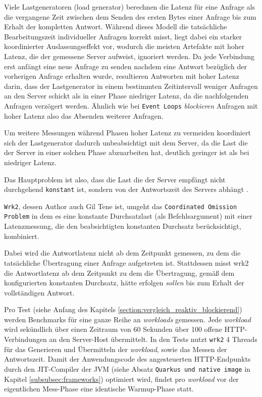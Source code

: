 Viele Lastgeneratoren (load generator) berechnen die Latenz für eine Anfrage als die vergangene Zeit zwischen dem Senden des ersten Bytes einer Anfrage
bis zum Erhalt der kompletten Antwort. Während dieses Modell die tatsächliche Bearbeitungszeit individueller Anfragen korrekt misst,
liegt dabei ein starker koordinierter Auslassungseffekt vor,
wodurch die meisten Artefakte mit hoher Latenz, die der gemessene Server aufweist, ignoriert werden.
Da jede Verbindung erst anfängt eine neue Anfrage zu senden nachdem eine Antwort bezüglich der vorherigen Anfrage erhalten wurde,
resultieren Antworten mit hoher Latenz darin, dass der Lastgenerator in einem bestimmten Zeitintervall weniger Anfragen an den Server schickt als in einer
Phase niedriger Latenz, da die nachfolgenden Anfragen verzögert werden. Ähnlich wie bei \verb|Event Loops| \textit{blockieren}
Anfragen mit hoher Latenz also das Absenden weiterer Anfragen.

Um weitere Messungen während Phasen hoher Latenz zu vermeiden koordiniert sich der Lastgenerator dadurch unbeabsichtigt mit dem Server, da die Last
die der Server in einer solchen Phase abzuarbeiten hat, deutlich geringer ist als bei niedriger Latenz.

Das Hauptproblem ist also, dass die Last die der Server empfängt
nicht durchgehend \verb|konstant| ist, sondern von der Antwortszeit des Servers abhängt \parencite{mci/Friedrich2017}.

\newpage
\verb|Wrk2|, dessen Author auch Gil Tene ist, umgeht das \verb|Coordinated Omission Problem| in dem es eine konstante Durchsatzlast (als Befehlsargument) mit
einer Latenzmessung, die den beabsichtigten konstanten Durchsatz berücksichtigt, kombiniert.

Dabei wird die Antwortlatenz nicht ab dem Zeitpunkt gemessen, zu dem die tatsächliche Übertragung einer Anfrage aufgetreten ist.
Stattdessen misst wrk2 die Antwortlatenz ab dem Zeitpunkt zu dem die Übertragung,
gemäß dem konfigurierten konstanten Durchsatz, hätte erfolgen \textit{sollen} bis zum Erhalt der vollständigen Antwort\parencite{Wrk2}.

Pro Test (siehe Anfang des Kapitels \ref{section:vergleich_reaktiv_blockierend}) werden Benchmarks für eine ganze Reihe an \textit{workloads} gemessen.
Jede \textit{workload} wird sekündlich über einen Zeitraum von 60 Sekunden über 100 offene HTTP-Verbindungen an den Server-Host übermittelt.
In den Tests nutzt \verb|wrk2| 4 Threads für das Generieren und Übermitteln der \textit{workload}, sowie das Messen der Antwortszeit.
\newline\newline
Damit der Anwendungscode des angesteuerten HTTP-Endpunkts durch den JIT-Compiler der JVM (siehe Absatz \verb|Quarkus und native image| in Kapitel
\ref{subsubsec:frameworks}) optimiert wird, findet pro \textit{workload} vor der eigentlichen Mess-Phase eine identische Warmup-Phase statt.

